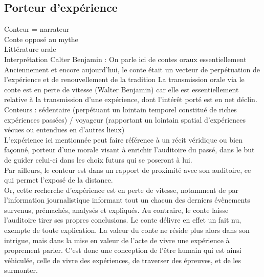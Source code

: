 \documentclass[a4paper,12pt,final,oneside]{article}
\begin{document}
\subsection{Porteur d'expérience}
Conteur = narrateur\\
Conte opposé au mythe\\
Littérature orale\\

Interprétation Calter Benjamin : \cite{nouss2003conteur}
On parle ici de contes oraux essentiellement
Anciennement et encore aujourd'hui, le conte était un vecteur de perpétuation de l'expérience et de renouvellement de la tradition
La transmission orale via le conte est en perte de vitesse (Walter Benjamin) car elle est essentiellement relative à la transmission d'une expérience, dont l'intérêt porté est en net déclin.\\
Conteurs : sédentaire (perpétuant un lointain temporel constitué de riches expériences passées) / voyageur (rapportant un lointain spatial d'expériences vécues ou entendues en d'autres lieux)\\

L'expérience ici mentionnée peut faire référence à un récit véridique ou bien façonné, porteur d'une morale visant à enrichir l'auditoire du passé, dans le but de guider celui-ci dans les choix futurs qui se poseront à lui.\\
Par ailleurs, le conteur est dans un rapport de proximité avec son auditoire, ce qui permet l'exposé de la distance.\\
Or, cette recherche d'expérience est en perte de vitesse, notamment de par l'information journalistique informant tout un chacun des derniers évènements survenus, prémachés, analysés et expliqués. Au contraire, le conte laisse l'auditoire tirer ses propres conclusions. Le conte délivre en effet un fait nu, exempte de toute explication. La valeur du conte ne réside plus alors dans son intrigue, mais dans la mise en valeur de l'acte de vivre une expérience à proprement parler. C'est donc une conception de l'être humain qui est ainsi véhiculée, celle de vivre des expériences, de traverser des épreuves, et de les surmonter.\\
\end{document}
